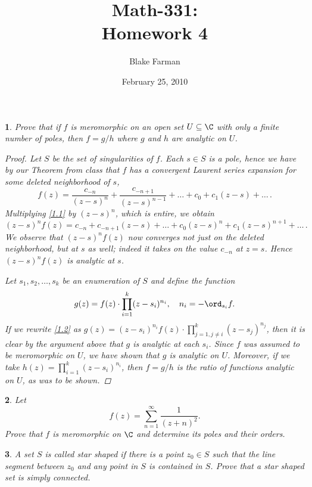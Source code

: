 \documentclass[10pt]{amsart}
\author{Blake Farman}
\title{Math-331:\\Homework 4}
\date{February 25, 2010}\pdfpagewidth 8.5in
\begin{document}
\maketitle

\newtheorem{thm}{}

\begin{thm}
  \label{Ex1}
  Prove that if $f$ is meromorphic on an open set $U \subseteq \C$ with only a finite number of poles, then $f = g/h$ where $g$ and $h$ are analytic on $U$. 
\begin{proof}
  Let $S$ be the set of singularities of $f$.  
  Each $s \in S$ is a pole, hence we have by our Theorem from class that $f$ has a convergent Laurent series expansion for some deleted neighborhood of $s$,
  \begin{equation}
    \label{1.1}
    f(z) = \frac{c_{-n}}{(z-s)^n} + \frac{c_{-n+1}}{(z-s)^{n-1}} + \ldots + c_0 + c_1(z-s) + \ldots\,.
  \end{equation}
  Multiplying \eqref{1.1} by $(z-s)^n$, which is entire, we obtain
  $$(z-s)^nf(z) = c_{-n} + c_{-n+1}(z-s) + \ldots + c_0(z-s)^n + c_1(z-s)^{n+1} + \ldots\,.$$
  We observe that $(z-s)^nf(z)$ now converges not just on the deleted neighborhood, but at $s$ as well; indeed it takes on the value $c_{-n}$ at $z = s$.
  Hence $(z-s)^nf(z)$ is analytic at $s$.
  
  Let $s_1, s_2, \ldots, s_k$ be an enumeration of $S$ and define the function 
  \begin{equation}
    \label{1.2}
    g(z) = f(z)\cdot\prod_{i=1}^k(z-s_i)^{n_i}, \quad  n_i = -\ord_{s_i}{f}.
  \end{equation}
  If we rewrite \eqref{1.2} as $g(z) = (z-s_i)^{n_i}f(z){\cdot}\prod_{j=1,j \not = i}^k(z-s_j)^{n_j}$, then it is clear by the argument above that $g$ is analytic at each $s_i$.
  Since $f$ was assumed to be meromorphic on $U$, we have shown that $g$ is analytic on $U$.
  Moreover, if we take $h(z) = \prod_{i=1}^k(z-s_i)^{n_i}$, then $f = g/h$ is the ratio of functions analytic on $U$, as was to be shown.
\end{proof}
\end{thm}

\begin{thm}
  \label{Ex2}
  Let $$f(z) = \sum\limits_{n=1}^\infty \dfrac{1}{(z+n)^2}.$$
Prove that $f$ is meromorphic on $\C$ and determine its poles and their orders.
\end{thm}

\begin{thm}
  \label{Ex3}
  A set $S$ is called {\it star shaped} if there is a point $z_0 \in S$ such that
the line segment between $z_0$ and any point in $S$ is contained in $S$.
Prove that a star shaped set is simply connected.
\end{thm}
\end{document}
